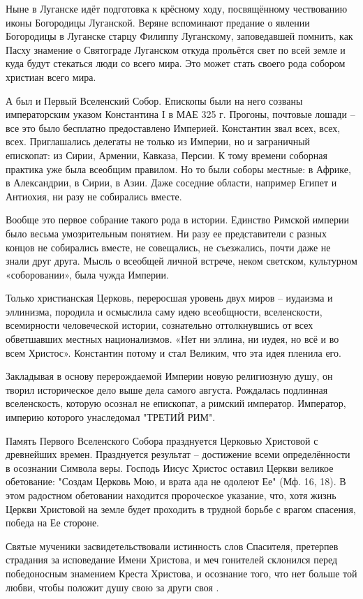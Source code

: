  Ныне в Луганске идёт подготовка к крёсному ходу, посвящённому чествованию
 иконы Богородицы Луганской. Веряне вспоминают предание о явлении Богородицы в
 Луганске старцу Филиппу Луганскому, заповедавшей помнить, как Пасху знамение о
 Святограде Луганском откуда прольётся свет по всей земле и куда будут
 стекаться люди со всего мира. Это может стать своего рода собором христиан
 всего мира.

А был и Первый Вселенский Собор. Епископы были на него созваны императорским
указом Константина I в МАЕ 325 г. Прогоны, почтовые лошади – все это было
бесплатно предоставлено Империей. Константин звал всех, всех, всех.
Приглашались делегаты не только из Империи, но и заграничный епископат: из
Сирии, Армении, Кавказа, Персии. К тому времени соборная практика уже была
всеобщим правилом. Но то были соборы местные: в Африке, в Александрии, в Сирии,
в Азии. Даже соседние области, например Египет и Антиохия, ни разу не
собирались вместе.

Вообще это первое собрание такого рода в истории. Единство Римской империи было
весьма умозрительным понятием. Ни разу ее представители с разных концов не
собирались вместе, не совещались, не съезжались, почти даже не знали друг
друга. Мысль о всеобщей личной встрече, неком светском, культурном
«соборовании», была чужда Империи.

Только христианская Церковь, переросшая уровень двух миров – иудаизма и
эллинизма, породила и осмыслила саму идею всеобщности, вселенскости,
всемирности человеческой истории, сознательно оттолкнувшись от всех обветшавших
местных национализмов. «Нет ни эллина, ни иудея, но всё и во всем Христос».
Константин потому и стал Великим, что эта идея пленила его. 

Закладывая в основу перерождаемой Империи новую религиозную душу, он творил
историческое дело выше дела самого августа. Рождалась подлинная вселенскость,
которую осознал не епископат, а римский император. Император, империю которого
унаследомал "ТРЕТИЙ РИМ". 

Память Первого Вселенского Собора празднуется Церковью Христовой с древнейших
времен. Празднуется результат – достижение всеми определённости в осознании
Символа веры. Господь Иисус Христос оставил Церкви великое обетование: "Создам
Церковь Мою, и врата ада не одолеют Ее" (Мф. 16, 18). В этом радостном
обетовании находится пророческое указание, что, хотя жизнь Церкви Христовой на
земле будет проходить в трудной борьбе с врагом спасения, победа на Ее стороне. 

Святые мученики засвидетельствовали истинность слов Спасителя, претерпев
страдания за исповедание Имени Христова, и меч гонителей склонился перед
победоносным знамением Креста Христова,  и осознание того, что нет больше той
любви, чтобы положит душу свою за други своя .

